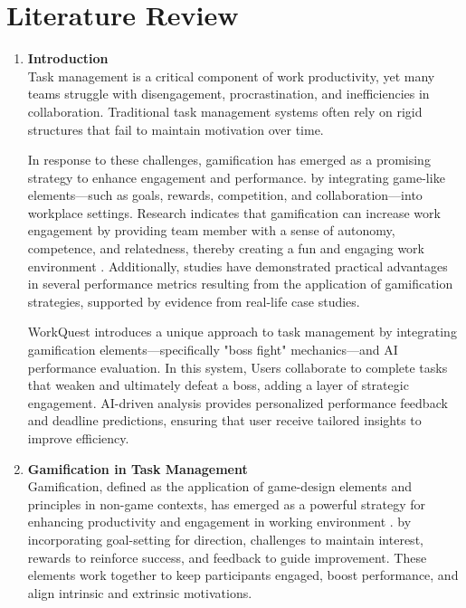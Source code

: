 \section{Literature Review}
\label{section:literature-review}
\begin{enumerate}
    \item \textbf{Introduction} \\
        Task management is a critical component of work productivity, yet many teams struggle with disengagement, procrastination, and inefficiencies in collaboration.
        Traditional task management systems often rely on rigid structures that fail to maintain motivation over time. 
        
        In response to these challenges, gamification has emerged as a promising strategy to enhance engagement and performance. by integrating game-like elements—such as goals, rewards, competition, and collaboration—into workplace settings. Research indicates that gamification can increase work engagement by providing team member with a sense of autonomy, competence, and relatedness, thereby creating a fun and engaging work environment \cite{ncbi:pmc10905147}.
        Additionally, studies have demonstrated practical advantages in several performance metrics resulting from the application of gamification strategies, supported by evidence from real-life case studies. \cite{Employee:Gamification}

        WorkQuest introduces a unique approach to task management by integrating gamification elements—specifically "boss fight" mechanics—and AI performance evaluation. In this system, Users collaborate to complete tasks that weaken and ultimately defeat a boss, adding a layer of strategic engagement. AI-driven analysis provides personalized performance feedback and deadline predictions, ensuring that user receive tailored insights to improve efficiency.
    
    \item \textbf{Gamification in Task Management} \\
        Gamification, defined as the application of game-design elements and principles in non-game contexts, has emerged as a powerful strategy for enhancing productivity and engagement in working environment \cite{ncbi:pmc10905147} \cite{Employee:Gamification}.
        by incorporating goal-setting for direction, challenges to maintain interest, rewards to reinforce success, and feedback to guide improvement. These elements work together to keep participants engaged, boost performance, and align intrinsic and extrinsic motivations. \cite{Game:Reward}
        

\end{enumerate}
